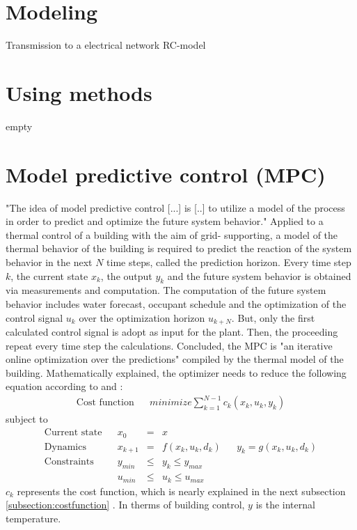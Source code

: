     
    
\section{Modeling}
\label{section:modeling}
    Transmission to a electrical network RC-model 

\section{Using methods}
\label{section:usingmethods}
empty

\section{Model predictive control (MPC)}
\label{section:mpc}
"The idea of model predictive control [...] is [..] to utilize a model of the process in order to predict and optimize the future system behavior."
\cite{Grune.2017}
Applied to a thermal control of a building with the aim of grid- supporting, a model of the thermal behavior of the building is required to predict the reaction of the system behavior in the next $N$ time steps, called the prediction horizon. Every time step $k$, the current state \textbf{$x_k$}, the output \textbf{$y_k$} and the future system behavior is obtained via measurements and computation. The computation of the future system behavior includes water forecast, occupant schedule  and the optimization of the control signal \textbf{$u_k$} over the optimization horizon \textbf{$u_{k+N}$}. But, only the first calculated control signal is adopt as input for the plant.
Then, the proceeding repeat every time step the calculations. Concluded, the MPC is "an iterative online optimization over the predictions"
\cite{Grune.2017} 
compiled by the thermal model of the building. Mathematically explained, the optimizer needs to reduce the following equation according to
\cite{Kouvaritakis.2018}
and
\cite{Oldewurtel.2012}:
\begin{align}
\label{eq:costfunc}
\textrm{Cost function} && minimize \sum_{k=1}^{N-1} c_k(x_k,u_k,y_k)
\end{align}
subject to 
\begin{align*}
\textrm{Current state} && x_0 &=& x \\	
\textrm{Dynamics} && x_{k+1}&=& f(x_k,u_k,d_k)		&&	y_k = g(x_k,u_k,d_k)\\				
\textrm{Constraints} && y_{min}&\leq& y_k \leq y_{max}\\		
\textrm{} && u_{min}&\leq& u_k \leq u_{max}	
\end{align*}
$c_k$ represents the cost function, which is nearly explained in the next subsection  \ref{subsection:costfunction}
. In therms of building control, $y$ is the internal temperature.
